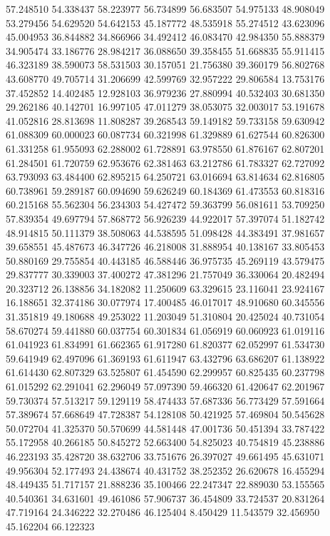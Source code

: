 57.248510
54.338437
58.223977
56.734899
56.683507
54.975133
48.908049
53.279456
54.629520
54.642153
45.187772
48.535918
55.274512
43.623096
45.004953
36.844882
34.866966
34.492412
46.083470
42.984350
55.888379
34.905474
33.186776
28.984217
36.088650
39.358455
51.668835
55.911415
46.323189
38.590073
58.531503
30.157051
21.756380
39.360179
56.802768
43.608770
49.705714
31.206699
42.599769
32.957222
29.806584
13.753176
37.452852
14.402485
12.928103
36.979236
27.880994
40.532403
30.681350
29.262186
40.142701
16.997105
47.011279
38.053075
32.003017
53.191678
41.052816
28.813698
11.808287
39.268543
59.149182
59.733158
59.630942
61.088309
60.000023
60.087734
60.321998
61.329889
61.627544
60.826300
61.331258
61.955093
62.288002
61.728891
63.978550
61.876167
62.807201
61.284501
61.720759
62.953676
62.381463
63.212786
61.783327
62.727092
63.793093
63.484400
62.895215
64.250721
63.016694
63.814634
62.816805
60.738961
59.289187
60.094690
59.626249
60.184369
61.473553
60.818316
60.215168
55.562304
56.234303
54.427472
59.363799
56.081611
53.709250
57.839354
49.697794
57.868772
56.926239
44.922017
57.397074
51.182742
48.914815
50.111379
38.508063
44.538595
51.098428
44.383491
37.981657
39.658551
45.487673
46.347726
46.218008
31.888954
40.138167
33.805453
50.880169
29.755854
40.443185
46.588446
36.975735
45.269119
43.579475
29.837777
30.339003
37.400272
47.381296
21.757049
36.330064
20.482494
20.323712
26.138856
34.182082
11.250609
63.329615
23.116041
23.924167
16.188651
32.374186
30.077974
17.400485
46.017017
48.910680
60.345556
31.351819
49.180688
49.253022
11.203049
51.310804
20.425024
40.731054
58.670274
59.441880
60.037754
60.301834
61.056919
60.060923
61.019116
61.041923
61.834991
61.662365
61.917280
61.820377
62.052997
61.534730
59.641949
62.497096
61.369193
61.611947
63.432796
63.686207
61.138922
61.614430
62.807329
63.525807
61.454590
62.299957
60.825435
60.237798
61.015292
62.291041
62.296049
57.097390
59.466320
61.420647
62.201967
59.730374
57.513217
59.129119
58.474433
57.687336
56.773429
57.591664
57.389674
57.668649
47.728387
54.128108
50.421925
57.469804
50.545628
50.072704
41.325370
50.570699
44.581448
47.001736
50.451394
33.787422
55.172958
40.266185
50.845272
52.663400
54.825023
40.754819
45.238886
46.223193
35.428720
38.632706
33.751676
26.397027
49.661495
45.631071
49.956304
52.177493
24.438674
40.431752
38.252352
26.620678
16.455294
48.449435
51.717157
21.888236
35.100466
22.247347
22.889030
53.155565
40.540361
34.631601
49.461086
57.906737
36.454809
33.724537
20.831264
47.719164
24.346222
32.270486
46.125404
8.450429
11.543579
32.456950
45.162204
66.122323
